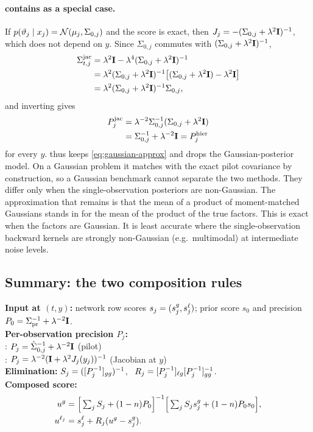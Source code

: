 \paragraph{\quiver{} contains \arrowm{} as a special case.}
If $p(\vartheta_j\mid x_j)=\mathcal{N}(\mu_j,\Sigma_{0,j})$ and the score is exact, then $J_j=-(\Sigma_{0,j}+\lambda^2\mathbf{I})^{-1}$, which does not depend on $y$.
Since $\Sigma_{0,j}$ commutes with $(\Sigma_{0,j}+\lambda^2\mathbf{I})^{-1}$,
\[
\begin{aligned}
  \Sigma_{t,j}^{\mathrm{jac}}&=\lambda^2\mathbf{I}-\lambda^4(\Sigma_{0,j}+\lambda^2\mathbf{I})^{-1}\\
  &=\lambda^2(\Sigma_{0,j}+\lambda^2\mathbf{I})^{-1}\big[(\Sigma_{0,j}+\lambda^2\mathbf{I})-\lambda^2\mathbf{I}\big]\\
  &=\lambda^2(\Sigma_{0,j}+\lambda^2\mathbf{I})^{-1}\Sigma_{0,j},
\end{aligned}
\]
and inverting gives
\begin{equation}\label{eq:quiver-reduces}
\begin{aligned}
  P_j^{\mathrm{jac}}&=\lambda^{-2}\Sigma_{0,j}^{-1}(\Sigma_{0,j}+\lambda^2\mathbf{I})\\
  &=\Sigma_{0,j}^{-1}+\lambda^{-2}\mathbf{I}=P_j^{\mathrm{hier}}
\end{aligned}
\end{equation}
for every $y$.
\quiver{} thus keeps \cref{eq:gaussian-approx} and drops the Gaussian-posterior model.
On a Gaussian problem it matches \arrowm{} with the exact pilot covariance by construction, so a Gaussian benchmark cannot separate the two methods.
They differ only when the single-observation posteriors are non-Gaussian.
The approximation that remains is that the mean of a product of moment-matched Gaussians stands in for the mean of the product of the true factors.
This is exact when the factors are Gaussian.
It is least accurate where the single-observation backward kernels are strongly non-Gaussian (e.g.\ multimodal) at intermediate noise levels.

\subsection{Summary: the two composition rules}\label{sec:summary}

\begin{tcolorbox}[colback=gray!4,colframe=gray!50,boxrule=0.4pt,left=3pt,right=3pt,top=2pt,bottom=2pt]
\small
\textbf{Input at $(t,y)$:} network row scores $s_j=(s_j^{g},s_j^{\ell})$; prior score $s_0$ and precision $P_{0}=\Sigma_\mathrm{pr}^{-1}+\lambda^{-2}\mathbf{I}$.\\[2pt]
\textbf{Per-observation precision $P_j$:}\\
\quad\arrowm: $P_j=\hat\Sigma_{0,j}^{-1}+\lambda^{-2}\mathbf{I}$ \hfill (pilot)\\
\quad\quiver: $P_j=\lambda^{-2}(\mathbf{I}+\lambda^2J_j(y_j))^{-1}$ \hfill (Jacobian at $y$)\\[2pt]
\textbf{Elimination:} $S_j=([P_j^{-1}]_{gg})^{-1}$, \ $R_j=[P_j^{-1}]_{\ell g}[P_j^{-1}]_{gg}^{-1}$.\\[2pt]
\textbf{Composed score:}
\begin{align*}
  u^{g}&=\Big[\textstyle\sum_jS_j+(1-n)P_{0}\Big]^{-1}\Big[\textstyle\sum_jS_js_j^{g}+(1-n)P_{0} s_0\Big],\\
  u^{\ell_j}&=s_j^{\ell}+R_j(u^{g}-s_j^{g}).
\end{align*}
\end{tcolorbox}
